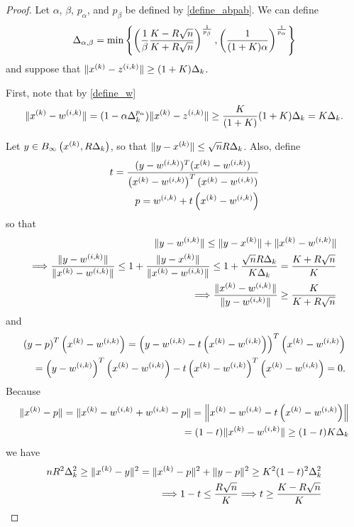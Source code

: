 \begin{proof}
Let $\alpha$, $\beta$, $p_{\alpha}$, and $p_{\beta}$ be defined by \cref{define_abpab}.
We can define
\begin{align}
{\Delta_{\alpha,\beta}} = \min\left\{
\left(\frac 1 {\beta }\frac {K - R\sqrt{n}}{K + R\sqrt{n}}\right)^{\frac 1 {p_{\beta }}},
\left(\frac 1 {(1+K)\alpha}\right)^{\frac 1 {p_{\alpha}}}
\right\} \label{define_deltalargzik}
\end{align}
and suppose that $\|x^{(k)} - {z^{(i, k)}}\| \ge (1+K) \Delta_k$.

First, note that by \cref{define_w}
\begin{align*}
\|x^{(k)} - {w^{(i, k)}}\| = (1 - \alpha\Delta_k^{p_{\alpha}}) \|x^{(k)} - {z^{(i, k)}}\| \ge \frac {K} {(1+K)} (1+K)\Delta_k = K\Delta_k.
\end{align*}

Let $y \in B_{\infty}\left(x^{(k)}, R \Delta_k\right)$, so that $\|y - x^{(k)}\| \le \sqrt{n}R\Delta_k$.
Also, define
\begin{align*}
t  = \frac{(y - {w^{(i, k)}})^T(x^{(k)} - {w^{(i, k)}})}{\left(x^{(k)} - {w^{(i, k)}}\right)^T(x^{(k)} - {w^{(i, k)}})} \\
p = {w^{(i, k)}} + t\left(x^{(k)} - {w^{(i, k)}}\right)
\end{align*}
so that
\begin{align*}
\|y - {w^{(i, k)}}\| \le \|y - x^{(k)}\| + \|x^{(k)} - {w^{(i, k)}}\| \\
\Longrightarrow \frac{\|y - {w^{(i, k)}}\|}{\|x^{(k)} - {w^{(i, k)}}\|} \le 1 +  \frac{\|y - x^{(k)}\|}{\|x^{(k)} - {w^{(i, k)}}\|} 
\le 1 + \frac{\sqrt{n}R\Delta_k}{K \Delta_k} = \frac {K+R\sqrt{n}}{K} \\
\Longrightarrow \frac{\|x^{(k)} - {w^{(i, k)}}\|}{\|y - {w^{(i, k)}}\|} \ge \frac {K}{K+R\sqrt{n}}
\end{align*}
and
\begin{align*}
\left(y - p\right)^T\left(x^{(k)} - {w^{(i, k)}}\right) = 
\left(y - {w^{(i, k)}} - t\left(x^{(k)} - {w^{(i, k)}}\right)\right)^T\left(x^{(k)} - {w^{(i, k)}}\right) \\
= \left(y - {w^{(i, k)}}\right)^T\left(x^{(k)} - {w^{(i, k)}}\right) - t\left(x^{(k)} - {w^{(i, k)}}\right)^T\left(x^{(k)} - {w^{(i, k)}}\right) = 0.
\end{align*}
Because
\begin{align*}
\|x^{(k)} - p\| = \|x^{(k)} - {w^{(i, k)}} + {w^{(i, k)}} - p\| = \left\|x^{(k)} - {w^{(i, k)}} - t\left(x^{(k)} - {w^{(i, k)}}\right)\right\| \\
= (1-t)\|x^{(k)} - {w^{(i, k)}}\| \ge (1-t)K\Delta_k
\end{align*}
we have
\begin{align*}
nR^2\Delta_k^2 \ge \|x^{(k)} - y\|^2 = \|x^{(k)} - p\|^2 + \|y - p\|^2 \ge K^2(1-t)^2\Delta_k^2  \\
\Longrightarrow 1-t \le \frac {R\sqrt{n}} {K} 
\Longrightarrow t \ge \frac {K - R\sqrt{n}}{K}
\end{align*}


\end{proof}
